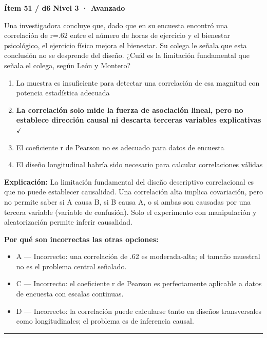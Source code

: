 \documentclass[12pt,a4paper]{article}
\begin{document}
\begin{mdframed}[backgroundcolor=fondogris,linecolor=rojo,linewidth=1pt,innerleftmargin=10pt,innerrightmargin=10pt,innertopmargin=7pt,innerbottommargin=7pt]
\textbf{Ítem 51 / d6} \hfill {\small\bfseries\color{rojo} Nivel 3 · Avanzado}
\end{mdframed}

Una investigadora concluye que, dado que en su encuesta encontró una correlación de r=.62 entre el número de horas de ejercicio y el bienestar psicológico, el ejercicio físico mejora el bienestar. Su colega le señala que esta conclusión no se desprende del diseño. ¿Cuál es la limitación fundamental que señala el colega, según León y Montero?

\begin{enumerate}
  \item[A.] La muestra es insuficiente para detectar una correlación de esa magnitud con potencia estadística adecuada
  \item[\textbf{\color{verde}B.}] \textbf{\color{verde} La correlación solo mide la fuerza de asociación lineal, pero no establece dirección causal ni descarta terceras variables explicativas} \hfill $\checkmark$
  \item[C.] El coeficiente r de Pearson no es adecuado para datos de encuesta
  \item[D.] El diseño longitudinal habría sido necesario para calcular correlaciones válidas
\end{enumerate}

\noindent\textbf{\color{azul}Explicación:} La limitación fundamental del diseño descriptivo correlacional es que no puede establecer causalidad. Una correlación alta implica covariación, pero no permite saber si A causa B, si B causa A, o si ambas son causadas por una tercera variable (variable de confusión). Solo el experimento con manipulación y aleatorización permite inferir causalidad.

\noindent\textbf{\color{gris}Por qué son incorrectas las otras opciones:}
\begin{itemize}
  \item {\small A — Incorrecto: una correlación de .62 es moderada-alta; el tamaño muestral no es el problema central señalado.}
  \item {\small C — Incorrecto: el coeficiente r de Pearson es perfectamente aplicable a datos de encuesta con escalas continuas.}
  \item {\small D — Incorrecto: la correlación puede calcularse tanto en diseños transversales como longitudinales; el problema es de inferencia causal.}
\end{itemize}
\vspace{8pt}\hrule\vspace{10pt}
\end{document}
